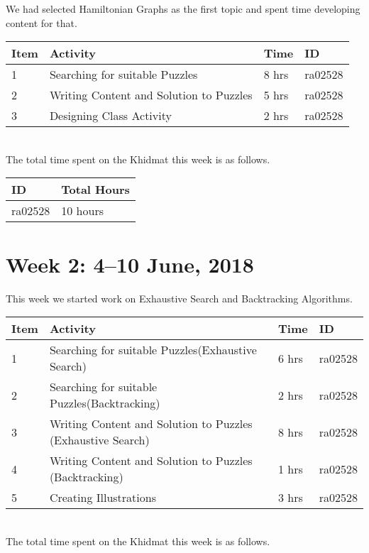 \documentclass{article}
\begin{document}
We had selected Hamiltonian Graphs as the first topic and spent time developing content for that.\\

\begin{tabular}{|l|l|l|l|}
    \hline
  Item 	& Activity & Time & ID \\\hline\hline
  1	& Searching for suitable Puzzles & 8 hrs & ra02528 \\\hline
  2	& Writing Content and Solution to Puzzles & 5 hrs & ra02528 \\\hline
  3	& Designing Class Activity & 2 hrs & ra02528 \\\hline
\end{tabular}\\


The total time spent on the Khidmat this week is as follows.

\begin{tabular}{|l|l|}
  \hline
  ID & Total Hours\\\hline\hline
  ra02528 & 10 hours\\\hline
\end{tabular}

\newpage %
\section*{Week 2: 4--10 June, 2018}
This week we started work on Exhaustive Search and Backtracking Algorithms.\\

\begin{tabular}{|l|l|l|l|}
  \hline
  Item 	& Activity & Time & ID \\\hline\hline
  1	& Searching for suitable Puzzles(Exhaustive Search) & 6 hrs & ra02528 \\\hline
  2	& Searching for suitable Puzzles(Backtracking) & 2 hrs & ra02528 \\\hline
  3	& Writing Content and Solution to Puzzles (Exhaustive Search)& 8 hrs & ra02528 \\\hline
  4	& Writing Content and Solution to Puzzles (Backtracking)& 1 hrs & ra02528 \\\hline
  5	& Creating Illustrations & 3 hrs & ra02528 \\\hline
\end{tabular}\\

The total time spent on the Khidmat this week is as follows.
\end{document}

